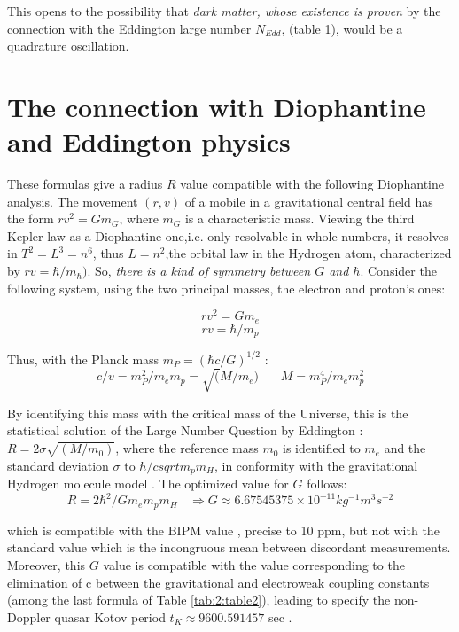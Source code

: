 \documentclass[a4paper,9pt]{article}
\begin{document}
    This opens to the possibility that \textit {dark matter, whose existence is proven} by the connection with the Eddington large number $N_{Edd}$, (table 1), would be a quadrature oscillation.
    
    \section{The connection with Diophantine and Eddington physics}

These formulas give a radius $R$ value compatible with the following Diophantine analysis. The movement $(r,v)$ of a mobile in a gravitational central field has the form $r v^2 = Gm_G$, where $m_G$ is a characteristic mass. Viewing the third Kepler law as a Diophantine one,i.e. only resolvable in whole numbers, it resolves in  $T^2 = L^3 = n^6$, thus $L = n^2$,the orbital law in the Hydrogen atom, characterized by $rv = \hbar/m_{\hbar})$. So, \textit{there is a kind of symmetry between $G$ and $\hbar$}. Consider the following system, using the two principal masses, the electron and proton's ones: 

\begin{equation}
  r v^2 = Gm_e
  \end{equation}
  \begin{equation}
r v = \hbar/m_p  
\end{equation}

Thus, with the Planck mass $m_P = (\hbar c/G)^{1/2}$ : 
\begin{equation}
c/v = m_P^2/m_em_p = \sqrt(M/m_e)~~~~~~~~   M = m_P^4/m_em_p^2
\end{equation}

By identifying this mass with the critical mass of the Universe, this is the statistical solution \cite{Durham} of the Large Number Question by Eddington  : $R = 2 \sigma \sqrt{(M/m_0)}$, where the reference mass $m_0$ is identified to $m_e$ and the standard deviation $\sigma$ to $\hbar/csqrt{m_pm_H}$, in conformity with the gravitational Hydrogen molecule model \cite{Sanchez}. The optimized value for $G$ follows:
\begin{equation}
R = 2\hbar^2/Gm_em_pm_H  ~~~~  \Rightarrow G \approx 6.67545375 \times 10^{-11}  kg^{-1}m^{3}s^{-2}    
\end{equation}

which is compatible with the BIPM value \cite{Quinn}, precise to 10 ppm, but not with the standard value \cite{Tannabashi} which is the incongruous mean between discordant measurements. Moreover, this $G$ value is compatible with the value corresponding to the elimination of c between the gravitational and electroweak coupling constants (among the last formula of Table \ref{tab:2:table2}), leading to specify the non-Doppler quasar Kotov period $t_K \approx 9600.591457$ sec \cite{Sanchez}.
\end{document}
